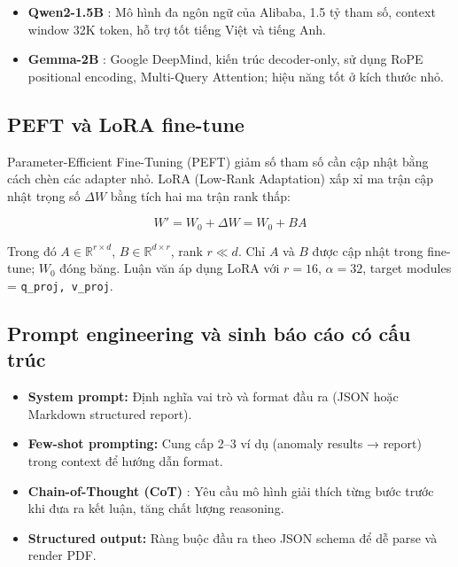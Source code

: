 \begin{itemize}
  \item \textbf{Qwen2-1.5B} \cite{qwen2023report}: Mô hình đa ngôn ngữ của Alibaba, 1.5 tỷ tham số, context window 32K token, hỗ trợ tốt tiếng Việt và tiếng Anh.
  \item \textbf{Gemma-2B} \cite{gemma2024}: Google DeepMind, kiến trúc decoder-only, sử dụng RoPE positional encoding, Multi-Query Attention; hiệu năng tốt ở kích thước nhỏ.
\end{itemize}

\subsection{PEFT và LoRA fine-tune}

Parameter-Efficient Fine-Tuning (PEFT) \cite{xu2023peft} giảm số tham số cần cập nhật bằng cách chèn các adapter nhỏ. LoRA (Low-Rank Adaptation) \cite{hu2022lora} xấp xỉ ma trận cập nhật trọng số $\Delta W$ bằng tích hai ma trận rank thấp:

\begin{equation}
  W' = W_0 + \Delta W = W_0 + B A
  \label{eq:lora}
\end{equation}

Trong đó $A \in \mathbb{R}^{r \times d}$, $B \in \mathbb{R}^{d \times r}$, rank $r \ll d$. Chỉ $A$ và $B$ được cập nhật trong fine-tune; $W_0$ đóng băng. Luận văn áp dụng LoRA với $r = 16$, $\alpha = 32$, target modules = \texttt{q\_proj, v\_proj}.

\subsection{Prompt engineering và sinh báo cáo có cấu trúc}

\begin{itemize}
  \item \textbf{System prompt:} Định nghĩa vai trò và format đầu ra (JSON hoặc Markdown structured report).
  \item \textbf{Few-shot prompting:} Cung cấp 2--3 ví dụ (anomaly results → report) trong context để hướng dẫn format.
  \item \textbf{Chain-of-Thought (CoT)} \cite{wei2022chain}: Yêu cầu mô hình giải thích từng bước trước khi đưa ra kết luận, tăng chất lượng reasoning.
  \item \textbf{Structured output:} Ràng buộc đầu ra theo JSON schema để dễ parse và render PDF.
\end{itemize}

